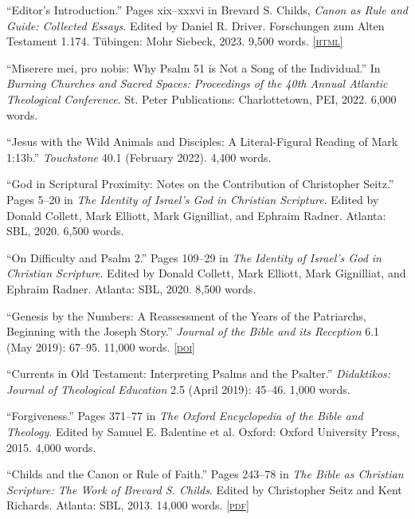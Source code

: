 \documentclass[11pt]{article}
\newcommand{\html}[1]{\href{#1}{\footnotesize\textsc{[html]}}}
\newcommand{\pdf}[1]{\href{#1}{\footnotesize\textsc{[pdf]}}}
\newcommand{\doi}[1]{\href{https://doi.org/#1}{\footnotesize\textsc{[doi]}}}
\newcommand{\years}[1]{\marginnote{\footnotesize #1}}
\begin{document}
\years{2023}
``Editor's Introduction.'' Pages xix--xxxvi in Brevard S. Childs, \emph{Canon as Rule and Guide: Collected Essays}. Edited by Daniel R. Driver. Forschungen zum Alten Testament 1.174. Tübingen: Mohr Siebeck, 2023. 9,500 words.
\html{http://danieldriver.com/bsc/}

\years{2022}
``Miserere mei, pro nobis: Why Psalm 51 is Not a Song of the Individual.'' In \emph{Burning Churches and Sacred Spaces: Proceedings of the 40th Annual Atlantic Theological Conference}. St. Peter Publications: Charlottetown, PEI, 2022. 6,000 words.

\years{2022}
``Jesus with the Wild Animals and Disciples: A Literal-Figural Reading of Mark 1:13b.'' \emph{Touchstone} 40.1 (February 2022). 4,400 words.
\clearpage%

\years{2020}%
 ``God in Scriptural Proximity: Notes on the Contribution of Christopher
Seitz.'' Pages 5--20 in \emph{The Identity of Israel’s God in Christian
Scripture}. Edited by Donald Collett, Mark Elliott, Mark Gignilliat, and
Ephraim Radner. Atlanta: SBL, 2020. 6,500 words.%

\years{2020}
``On Difficulty and Psalm 2.'' Pages 109--29 in \emph{The Identity of
Israel’s God in Christian Scripture}. Edited by Donald Collett, Mark
Elliott, Mark Gignilliat, and Ephraim Radner. Atlanta: SBL, 2020. 8,500 words.%

\years{2019}
``Genesis by the Numbers: A Reassessment of the Years of the Patriarchs,
Beginning with the Joseph Story.'' \emph{Journal of the Bible and its
Reception} 6.1 (May 2019): 67–95. 11,000 words.
\doi{10.1515/jbr-2019-1003}

\years{2019}
``Currents in Old Testament: Interpreting Psalms and the Psalter.''
\emph{Didaktikos: Journal of Theological Education} 2.5 (April 2019):
45–46. 1,000 words.%

\years{2015}
``Forgiveness.'' Pages 371--77 in \emph{The Oxford Encyclopedia of the
Bible and Theology}. Edited by Samuel E. Balentine et al. Oxford: Oxford
University Press, 2015. 4,000 words.

\years{2013}
``Childs and the Canon or Rule of Faith.'' Pages 243--78 in \emph{The
Bible as Christian Scripture: The Work of Brevard S. Childs}. Edited by
Christopher Seitz and Kent Richards. Atlanta: SBL, 2013. 14,000 words.
\pdf{http://danieldriver.com/assets/pdf/publications/Driver_2013.pdf}
\end{document}

